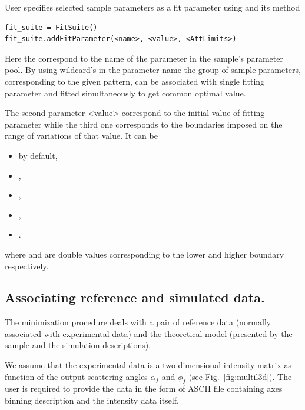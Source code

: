 User specifies selected sample parameters as a fit parameter using 
and its  method

\begin{lstlisting}[language=shell, style=commandline]
fit_suite = FitSuite()
fit_suite.addFitParameter(<name>, <value>, <AttLimits>)
\end{lstlisting}

Here the  correspond to the name of the parameter in the sample's parameter pool.
By using wildcard's in the parameter name the group of sample parameters, corresponding to the given
pattern, can be associated with single fitting parameter and 
fitted simultaneously to get common optimal value.

The second parameter \Code <value> correspond to the initial value of fitting parameter
while the third one  corresponds to
the boundaries imposed on the range of variations of that value. It can be
\begin{itemize}
\item {} by default, 
\item {}, 
\item {}, 
\item {}, 
\item {}.
\end{itemize}
where  and  are
double values corresponding to the lower and higher boundary respectively.


%
\subsection{Associating reference and simulated data.}

The minimization procedure deals with a pair of reference data (normally
associated with experimental data) and the theoretical model (presented by the sample and the simulation descriptions).

We assume that the experimental data is a two-dimensional intensity 
matrix as function of the output scattering
angles $\alpha_f$ and $\phi_f$ (see Fig.~\ref{fig:multil3d}).
The user is required to provide the data in the form of ASCII file containing axes
binning description and the intensity data itself. 
\vspace*{2mm}

